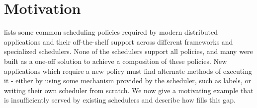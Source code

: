 \section{Motivation}
\label{sec:escher_motivation}




 lists some common scheduling policies required by modern distributed applications and their off-the-shelf support across different frameworks and specialized schedulers. 
None of the schedulers support all policies, and many were built as a one-off solution to achieve a composition of these policies. 
New applications which require a new policy must find alternate methods of executing it - either by using some mechanism provided by the scheduler, such as labels, or writing their own scheduler from scratch. %
We now give a motivating example that is insufficiently served by existing schedulers and describe how \name{} fills this gap.


